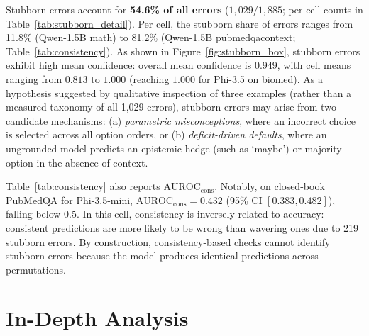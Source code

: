 \documentclass[sigconf,nonacm]{acmart}
\makeatletter
\DeclareRobustCommand{\_}{\ifmmode\nfss@text{\textunderscore}\else\textunderscore\allowbreak\fi}
\makeatother
\begin{document}
Stubborn errors account for \textbf{54.6\% of all errors} ($1{,}029 / 1{,}885$; per-cell counts in Table~\ref{tab:stubborn_detail}). Per cell, the stubborn share of errors ranges from 11.8\% (\textsf{Qwen-1.5B} math) to 81.2\% (\textsf{Qwen-1.5B} \textsf{pubmedqa\_context}; Table~\ref{tab:consistency}). As shown in Figure~\ref{fig:stubborn_box}, stubborn errors exhibit high mean confidence: overall mean confidence is $0.949$, with cell means ranging from $0.813$ to $1.000$ (reaching $1.000$ for \textsf{Phi-3.5} on biomed). As a hypothesis suggested by qualitative inspection of three examples (rather than a measured taxonomy of all 1,029 errors), stubborn errors may arise from two candidate mechanisms: (a) \textit{parametric misconceptions}, where an incorrect choice is selected across all option orders, or (b) \textit{deficit-driven defaults}, where an ungrounded model predicts an epistemic hedge (such as `maybe') or majority option in the absence of context.

Table~\ref{tab:consistency} also reports $\text{AUROC}_{\text{cons}}$. Notably, on closed-book PubMedQA for \textsf{Phi-3.5-mini}, $\text{AUROC}_{\text{cons}} = 0.432$ (95\% CI $[0.383, 0.482]$), falling below 0.5. In this cell, consistency is inversely related to accuracy: consistent predictions are more likely to be wrong than wavering ones due to 219 stubborn errors. By construction, consistency-based checks cannot identify stubborn errors because the model produces identical predictions across permutations.

\section{In-Depth Analysis}
\end{document}
